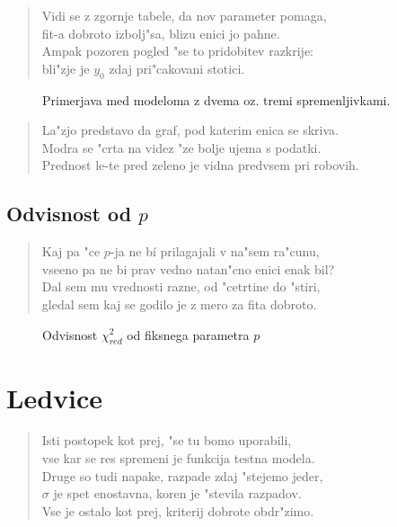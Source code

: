\documentclass[a4paper,10pt]{article}
\begin{document}
\begin{verse}
Vidi se z zgornje tabele, da nov parameter pomaga, \\
fit-a dobroto izbolj"sa, blizu enici jo pahne. \\
Ampak pozoren pogled "se to pridobitev razkrije: \\
bli"zje je $y_0$ zdaj pri"cakovani stotici. 
\end{verse}

\begin{figure}[h]
 
  \caption{Primerjava med modeloma z dvema oz. tremi spremenljivkami. }
  \label{fig:farmacija}
\end{figure}

\begin{verse}
 La"zjo predstavo da graf, pod katerim enica se skriva. \\
 Modra se "crta na videz "ze bolje ujema s podatki. \\
 Prednost le-te pred zeleno je vidna predvsem pri robovih. 
\end{verse}

\newpage
\subsection{Odvisnost od $p$}
\begin{verse}
 Kaj pa "ce $p$-ja ne b\'i prilagajali v na"sem ra"cunu, \\
 vseeno pa ne bi prav vedno natan"cno enici enak bil? \\
 Dal sem mu vrednosti razne, od "cetrtine do "stiri, \\
 gledal sem kaj se godilo je z mero za fita dobroto. 
\end{verse}

\begin{figure}[h]
 
\caption{Odvisnost $\chi^2_{red}$ od fiksnega parametra $p$ }
\label{fig:farmacija-hi}
\end{figure}

\newpage

\section{Ledvice}
\begin{verse}
 Isti postopek kot prej, "se tu bomo uporabili, \\
 vse kar se res spremeni je funkcija testna modela. \\
 Druge so tudi napake, razpade zdaj "stejemo jeder, \\
 $\sigma$ je spet enostavna, koren je "stevila razpadov. \\
 Vse je ostalo kot prej, kriterij dobrote obdr"zimo. 
\end{verse}
\end{document}
